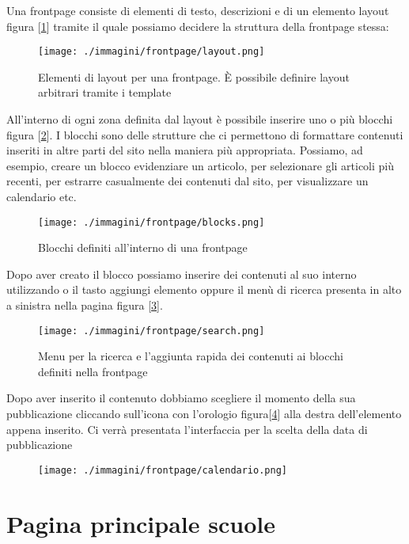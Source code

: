 Una frontpage consiste di elementi di testo, descrizioni e di un elemento layout figura [\ref{fig:frontpage_layout}] tramite il quale possiamo decidere la struttura della frontpage stessa:
\begin{figure}[H]
 \centering
 \texttt{[image: ./immagini/frontpage/layout.png]}
 \caption{Elementi di layout per una frontpage. È possibile definire layout arbitrari tramite i template}
 \label{fig:frontpage_layout}
\end{figure}
All'interno di ogni zona definita dal layout è possibile inserire uno o più blocchi figura [\ref{fig:frontpage_blocks}]. I blocchi sono delle strutture che ci permettono di formattare contenuti inseriti in altre parti del sito nella maniera più appropriata. Possiamo, ad esempio, creare un blocco evidenziare un articolo, per selezionare gli articoli più recenti, per estrarre casualmente dei contenuti dal sito, per visualizzare un calendario etc.
\begin{figure}[H]
 \centering
 \texttt{[image: ./immagini/frontpage/blocks.png]}
 \caption{Blocchi definiti all'interno di una frontpage}
 \label{fig:frontpage_blocks}
\end{figure}
Dopo aver creato  il blocco possiamo inserire dei contenuti al suo interno utilizzando o il tasto aggiungi elemento oppure il menù di ricerca presenta in alto a sinistra nella pagina figura [\ref{fig:frontpage_search}].
\begin{figure}[H]
 \centering
 \texttt{[image: ./immagini/frontpage/search.png]}
 \caption{Menu per la ricerca e l'aggiunta rapida dei contenuti ai blocchi definiti nella frontpage}
 \label{fig:frontpage_search}
\end{figure}
Dopo aver inserito il contenuto dobbiamo scegliere il momento della sua pubblicazione cliccando sull'icona con l'orologio figura[\ref{fig:frontpage_calendar}] alla destra dell'elemento appena inserito. Ci verrà presentata l'interfaccia per la scelta della data di pubblicazione \begin{figure}
 \centering
 \texttt{[image: ./immagini/frontpage/calendario.png]}
 \label{fig:frontpage_calendar}
\end{figure}

\section{Pagina principale scuole}


